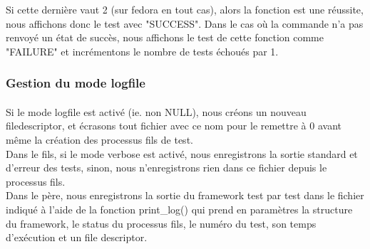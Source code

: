 \documentclass[12pt]{article}
\begin{document}
Si cette dernière vaut 2 (sur fedora en tout cas), alors la fonction est une réussite, nous affichons donc le test avec "SUCCESS". Dans le cas où la commande n'a pas renvoyé un état de succès, nous affichons le test de cette fonction comme "FAILURE" et incrémentons le nombre de tests échoués par 1.\\

\subsubsection{Gestion du mode logfile}
\paragraph{}
Si le mode logfile est activé (ie. non NULL), nous créons un nouveau filedescriptor, et écrasons tout fichier avec ce nom pour le remettre à 0 avant même la création des processus fils de test.\\

Dans le fils, si le mode verbose est activé, nous enregistrons la sortie standard et d'erreur des tests, sinon, nous n'enregistrons rien dans ce fichier depuis le processus fils.\\

Dans le père, nous enregistrons la sortie du framework test par test dans le fichier indiqué à l'aide de la fonction print\_log() qui prend en paramètres la structure du framework, le status du processus fils, le numéro du test, son temps d'exécution et un file descriptor.\\
\end{document}
